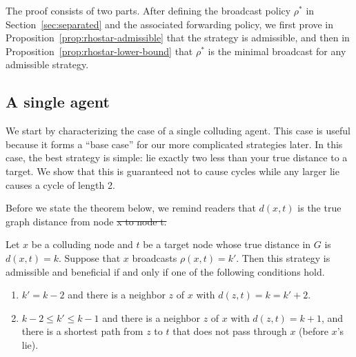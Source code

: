 \documentclass{comnet}
\providecommand{\DIFadd}[1]{{\protect\color{blue}\uwave{#1}}} %
\providecommand{\DIFdel}[1]{{\protect\color{red}\sout{#1}}}                      %
\providecommand{\DIFaddbegin}{} %
\providecommand{\DIFaddend}{} %
\providecommand{\DIFdelbegin}{} %
\providecommand{\DIFdelend}{} %
\begin{document}
The proof consists of two parts. After defining the broadcast policy $\rho^*$
in Section~\ref{sec:separated} and the associated forwarding policy, we first
prove in Proposition~\ref{prop:rhostar-admissible} that the strategy is
admissible, and then in Proposition~\ref{prop:rhostar-lower-bound} that
$\rho^*$ is the minimal broadcast for any admissible strategy.

\subsection{A single agent} \label{sec:single-agent}

We start by characterizing the case of a single colluding agent. This case is
useful because it forms a ``base case'' for our more complicated strategies
later. In this case, the best strategy is simple: lie exactly two less than
your true distance to a target. We show that this is guaranteed not to cause
cycles while any larger lie causes a cycle of length 2. 

Before we state the theorem below, we remind readers that $d(x,t)$ is the true
graph distance from node \DIFdelbegin \DIFdel{x to node t.
}\DIFdelend \DIFaddbegin \DIFadd{$x$ to node $t$.
}

\DIFaddend \begin{theorem} \label{thm:single-agent}

Let $x$ be a colluding node and $t$ be a target node whose true distance in $G$
is $d(x,t) = k$. Suppose that $x$ broadcasts $\rho(x,t) = k'$. Then this
strategy is admissible and beneficial if and only if one of the following
conditions hold.

\begin{enumerate}
   \item $k' = k - 2$ and there is a neighbor $z$ of $x$ with $d(z,t) = k = k'
+ 2$.
   \item $k-2 \leq k' \leq k-1$ and there is a neighbor $z$ of $x$ with $d(z,t)
= k + 1$, and there is a shortest path from $z$ to $t$ that does not pass
through $x$ (before $x$'s lie).
\end{enumerate}

\end{theorem}
\end{document}
